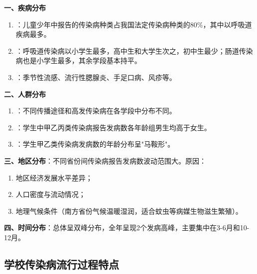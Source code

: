 \begin{keybox}
\textbf{一、疾病分布}
\begin{enumerate}[leftmargin=*]
    \item {}：儿童少年中报告的传染病种类占我国法定传染病种类的80\%，其中以呼吸道疾病最多。
    \item {}：呼吸道传染病以小学生最多，高中生和大学生次之，初中生最少；肠道传染病也是小学生最多，其余学段基本持平。
    \item {}：季节性流感、流行性腮腺炎、手足口病、风疹等。
\end{enumerate}

\textbf{二、人群分布}
\begin{enumerate}[leftmargin=*]
    \item {}：不同传播途径和高发传染病在各学段中分布不同。
    \item {}：学生中甲乙丙类传染病报告发病数各年龄组男生均高于女生。
    \item {}：学生甲乙类传染病发病数的年龄分布呈"马鞍形"。
\end{enumerate}

\textbf{三、地区分布}：不同省份间传染病报告发病数波动范围大。原因：
\begin{enumerate}[leftmargin=*]
    \item 地区经济发展水平差异；
    \item 人口密度与流动情况；
    \item 地理气候条件（南方省份气候温暖湿润，适合蚊虫等病媒生物滋生繁殖）。
\end{enumerate}

\textbf{四、时间分布}：总体呈双峰分布，全年呈现2个发病高峰，主要集中在3-6月和10-12月。
\end{keybox}

\subsection{学校传染病流行过程特点}


